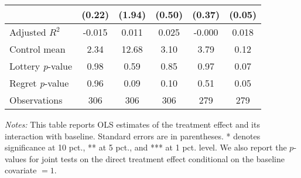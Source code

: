 \begin{table}[htbp]
{\begin{threeparttable}
\begin{tabular}{l*{5}{c}}
                &   (0.22)         &   (1.94)         &   (0.50)         &   (0.37)         &   (0.05)         \\
\midrule
Adjusted \(R^{2}\)&   -0.015         &    0.011         &    0.025         &   -0.000         &    0.018         \\
Control mean    &     2.34         &    12.68         &     3.10         &     3.79         &     0.12         \\
Lottery \emph{p}-value&     0.98         &     0.59         &     0.85         &     0.97         &     0.07         \\
Regret \emph{p}-value&     0.96         &     0.09         &     0.10         &     0.51         &     0.05         \\
Observations    &      306         &      306         &      306         &      279         &      279         \\
\bottomrule \end{tabular} \begin{tablenotes}[flushleft] \footnotesize \item \emph{Notes:} This table reports OLS estimates of the treatment effect and its interaction with baseline. Standard errors are in parentheses. * denotes significance at 10 pct., ** at 5 pct., and *** at 1 pct. level. We also report the \(p\)-values for joint tests on the direct treatment effect conditional on the baseline covariate $= 1$. \end{tablenotes} \end{threeparttable} } \end{table}
